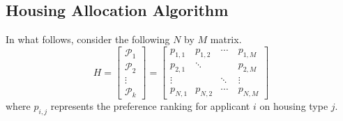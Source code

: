 \documentclass[11pt]{article}
\begin{document}
\subsection{Housing Allocation Algorithm}
In what follows, consider the following $N$ by $M$ matrix. 
\[H =
\begin{bmatrix}
    \mathcal{P}_1 \\
    \mathcal{P}_2 \\
    \vdots \\
    \mathcal{P}_k
\end{bmatrix}
=
\begin{bmatrix}
    p_{1,1} & p_{1,2} & \cdots & p_{1,M} \\
    p_{2,1} & \ddots & \quad & p_{2,M} \\
    \vdots & \quad & \ddots & \vdots \\
    p_{N,1} & p_{N,2} & \cdots & p_{N,M} 
\end{bmatrix}\]
where $p_{i,j}$ represents the preference ranking for applicant $i$ on housing type $j$.
\end{document}
